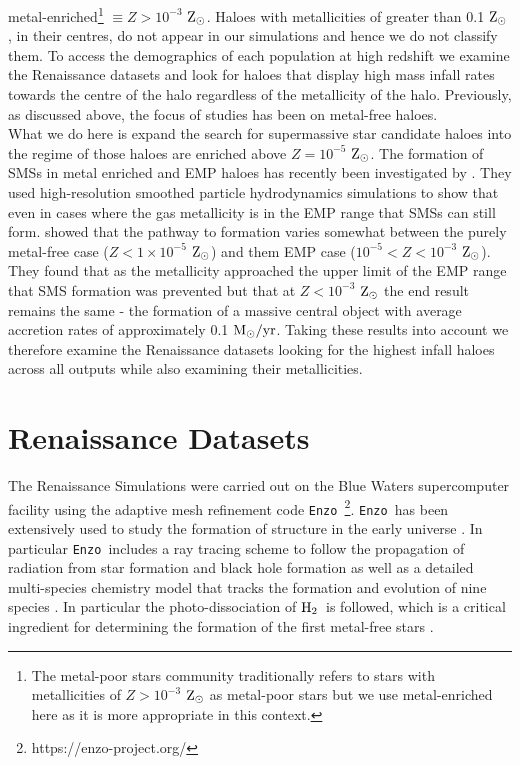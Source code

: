 \documentclass[graphics, twocolumn, usenatbib]{mn2e}
\newcommand{\enzo}{\texttt{Enzo~}}
\newcommand{\msolaryrc} {$\rm{M_{\odot}/yr}$}
\newcommand{\zsolar} {$\rm{Z_{\odot}}~$}
\newcommand{\zsolarc} {$\rm{Z_{\odot}}$}
\newcommand{\molH} {$\rm{H_2}$~}
\begin{document}
metal-enriched\footnote{The metal-poor stars community traditionally refers to stars with
  metallicities of $Z > 10^{-3}$ \zsolar as metal-poor stars but we use metal-enriched here as it
  is more appropriate in this context.} $\equiv Z > 10^{-3}$ \zsolarc. Haloes with metallicities of
greater than 0.1 \zsolarc, in their centres, do not appear in our simulations and hence we do not
classify them.
To access the demographics of each population at high redshift we examine the Renaissance datasets
and look for haloes that display high mass infall
  rates towards the centre of the halo regardless of the metallicity of the halo. Previously, as
  discussed above, the focus of studies has been on metal-free haloes. \\
  \indent What we do here is expand
  the search for supermassive star candidate haloes into the regime of those haloes are
  enriched above $Z = 10^{-5}$ \zsolarc. The formation of SMSs in metal enriched and EMP haloes
  has recently been investigated by \cite{Chon_2020}. They used high-resolution smoothed particle
  hydrodynamics simulations to show that even in cases where the gas metallicity is in the EMP range
  that SMSs can still form. \cite{Chon_2020} showed that the pathway to
    formation varies somewhat between the purely metal-free case ($Z < 1 \times 10^{-5}$ \zsolarc) and
    them EMP case  ($10^{-5} <  Z < 10^{-3}$ \zsolarc). They found that as the 
    metallicity approached the upper limit of the EMP range that SMS formation was prevented but
    that at $Z < 10^{-3}$ \zsolar the end result remains the same - the formation
  of a massive central object with average accretion rates of approximately 0.1 \msolaryrc.
  Taking these results into account we therefore examine the Renaissance datasets looking
  for the highest infall haloes across all outputs while also examining their metallicities. 

\section{Renaissance Datasets} \label{Sec:RenaissanceDatasets}
The Renaissance Simulations were carried out on the Blue Waters supercomputer facility using the
adaptive mesh refinement code \enzo\citep{Enzo_2014, Enzo_2019}\footnote{https://enzo-project.org/}.
\enzo has been extensively used to study the formation of structure in the early universe
\citep{Abel_2002, OShea_2005b, Turk_2012, Wise_2012b, Wise_2014, Regan_2015, Regan_2017}. In
particular \enzo includes a ray tracing scheme to follow the propagation of radiation from star
formation and
black hole formation \citep{WiseAbel_2011} as well as a detailed multi-species chemistry model that
tracks the formation and evolution of nine species \citep{Anninos_1997, Abel_1997, Grackle}. In
particular the photo-dissociation of \molH is followed, which is a critical ingredient for
determining the formation of the first metal-free stars \citep{Abel_2000}. 
\end{document}
